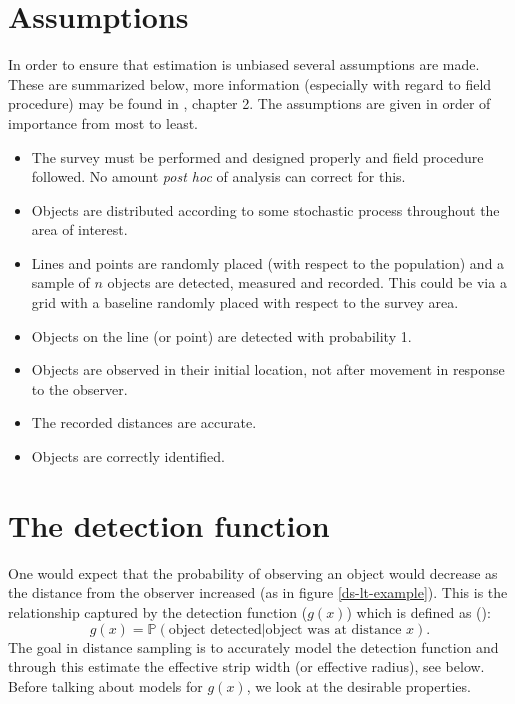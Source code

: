 \section{Assumptions}
In order to ensure that estimation is unbiased several assumptions are made. These are summarized below, more information (especially with regard to field procedure) may be found in , chapter 2. The assumptions are given in order of importance from most to least.
\begin{itemize}
	\item The survey must be performed and designed properly and field procedure followed. No amount \textit{post hoc} of analysis can correct for this.
	\item Objects are distributed according to some stochastic process throughout the area of interest.
	\item Lines and points are randomly placed (with respect to the population) and a sample of $n$ objects are detected, measured and recorded. This could be via a grid with a baseline randomly placed with respect to the survey area.
	\item Objects on the line (or point) are detected with probability 1.
	\item Objects are observed in their initial location, not after movement in response to the observer.
	\item The recorded distances are accurate.
	\item Objects are correctly identified.
\end{itemize}

\section{The detection function}
\label{intro-ds-detefct}

One would expect that the probability of observing an object would decrease as the distance from the observer increased (as in figure \ref{ds-lt-example}). This is the relationship captured by the detection function ($g(x)$) which is defined as (\cite[p. 10]{IDS}):
\begin{equation*}
g(x)=\mathbb{P} (\text{object detected} | \text{object was at distance } x).
\end{equation*}
The goal in distance sampling is to accurately model the detection function and through this estimate the effective strip width (or effective radius), see  below. Before talking about models for $g(x)$, we look at the desirable properties.

